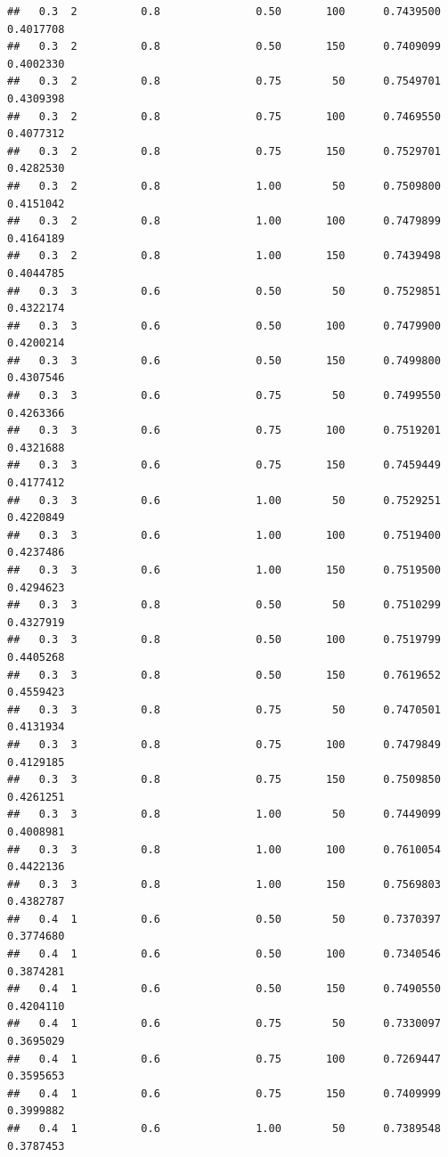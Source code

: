 \documentclass[
]{book}
\theoremstyle{break}
\theoremstyle{definition}
\theoremstyle{definition}
\theoremstyle{definition}
\theoremstyle{definition}
\theoremstyle{remark}
\begin{document}
\begin{verbatim}
##   0.3  2          0.8               0.50       100      0.7439500  0.4017708
##   0.3  2          0.8               0.50       150      0.7409099  0.4002330
##   0.3  2          0.8               0.75        50      0.7549701  0.4309398
##   0.3  2          0.8               0.75       100      0.7469550  0.4077312
##   0.3  2          0.8               0.75       150      0.7529701  0.4282530
##   0.3  2          0.8               1.00        50      0.7509800  0.4151042
##   0.3  2          0.8               1.00       100      0.7479899  0.4164189
##   0.3  2          0.8               1.00       150      0.7439498  0.4044785
##   0.3  3          0.6               0.50        50      0.7529851  0.4322174
##   0.3  3          0.6               0.50       100      0.7479900  0.4200214
##   0.3  3          0.6               0.50       150      0.7499800  0.4307546
##   0.3  3          0.6               0.75        50      0.7499550  0.4263366
##   0.3  3          0.6               0.75       100      0.7519201  0.4321688
##   0.3  3          0.6               0.75       150      0.7459449  0.4177412
##   0.3  3          0.6               1.00        50      0.7529251  0.4220849
##   0.3  3          0.6               1.00       100      0.7519400  0.4237486
##   0.3  3          0.6               1.00       150      0.7519500  0.4294623
##   0.3  3          0.8               0.50        50      0.7510299  0.4327919
##   0.3  3          0.8               0.50       100      0.7519799  0.4405268
##   0.3  3          0.8               0.50       150      0.7619652  0.4559423
##   0.3  3          0.8               0.75        50      0.7470501  0.4131934
##   0.3  3          0.8               0.75       100      0.7479849  0.4129185
##   0.3  3          0.8               0.75       150      0.7509850  0.4261251
##   0.3  3          0.8               1.00        50      0.7449099  0.4008981
##   0.3  3          0.8               1.00       100      0.7610054  0.4422136
##   0.3  3          0.8               1.00       150      0.7569803  0.4382787
##   0.4  1          0.6               0.50        50      0.7370397  0.3774680
##   0.4  1          0.6               0.50       100      0.7340546  0.3874281
##   0.4  1          0.6               0.50       150      0.7490550  0.4204110
##   0.4  1          0.6               0.75        50      0.7330097  0.3695029
##   0.4  1          0.6               0.75       100      0.7269447  0.3595653
##   0.4  1          0.6               0.75       150      0.7409999  0.3999882
##   0.4  1          0.6               1.00        50      0.7389548  0.3787453

\end{verbatim}
\end{document}
